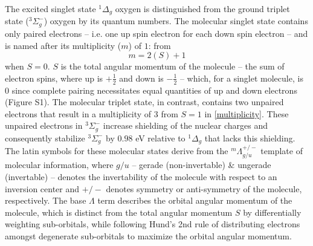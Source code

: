 The excited singlet state $^1\Delta_g$ oxygen is distinguished from the ground triplet state ($^3\Sigma_g^-$) oxygen \cite{DeRosa2002PhotosensitizedApplications} by its quantum numbers. The molecular singlet state contains only paired electrons -- i.e. one up spin electron for each down spin electron -- and is named after its multiplicity ($m$) \cite{Fumi1953ElectronicMolecule} of $1$: from 
\begin{equation} \label{multiplicity}
    m = 2(S)+1
\end{equation}
when $S=0$. $S$ is the total angular momentum of the molecule -- the sum of electron spins, where up is $+\frac{1}{2}$ and down is $-\frac{1}{2}$ -- which, for a singlet molecule, is 0 since complete pairing necessitates equal quantities of up and down electrons (Figure S1). The molecular triplet state, in contrast, contains two unpaired electrons that result in a multiplicity of $3$ from $S=1$ in \cref{multiplicity}. These unpaired electrons in $^3\Sigma_g^-$ increase shielding of the nuclear charges \cite{Katriel1972ARule} and consequently stabilize $^3\Sigma_g^-$ by $0.98$ eV \cite{Jockusch2008SingletExcitation} relative to $^1\Delta_g$ that lacks this shielding. The latin symbols for these molecular states derive from the $^{m}\Lambda _{g/u}^{+/-}$ template of molecular information, where $g/u$ -- gerade (non-invertable) \& ungerade (invertable) -- denotes the invertability of the molecule with respect to an inversion center and $+/-$ denotes symmetry or anti-symmetry of the molecule, respectively. The base $\Lambda$ term describes the orbital angular momentum of the molecule, which is distinct from the total angular momentum $S$ by differentially weighting sub-orbitals, while following Hund's 2nd rule of distributing electrons amongst degenerate sub-orbitals to maximize the orbital angular momentum.

